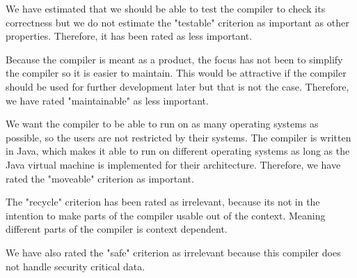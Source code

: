 We have estimated that we should be able to test the compiler to check its correctness but we do not estimate the "testable" criterion as important as other properties. Therefore, it has been rated as less important.

Because the compiler is meant as a product, the focus has not been to simplify the compiler so it is easier to maintain. This would be attractive if the compiler should be used for further development later but that is not the case. Therefore, we have rated "maintainable" as less important.

We want the compiler to be able to run on as many operating systems as possible, so the users are not restricted by their systems. The compiler is written in Java, which makes it able to run on different operating systems as long as the Java virtual machine is implemented for their architecture. Therefore, we have rated the "moveable" criterion as important.

The "recycle" criterion has been rated as irrelevant, because its not in the intention to make parts of the compiler usable out of the context. Meaning different parts of the compiler is context dependent.

We have also rated the "safe" criterion as irrelevant because this compiler does not handle security critical data.